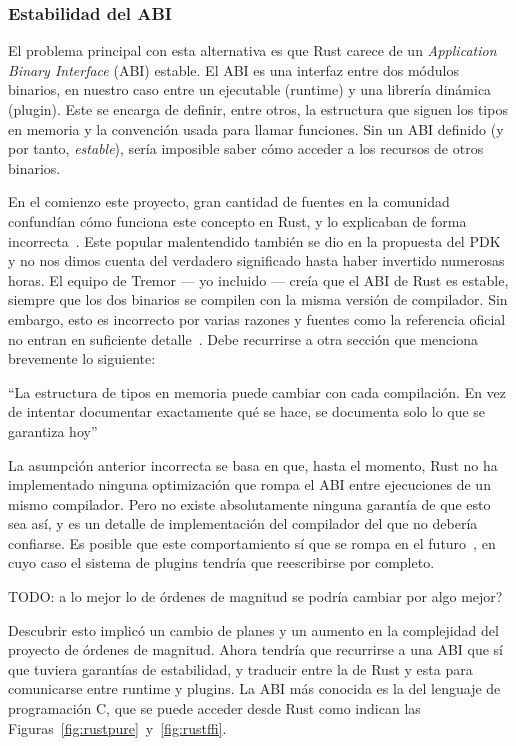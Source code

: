 \subsubsection{Estabilidad del ABI}\label{sec:abi}

El problema principal con esta alternativa es que Rust carece de un
\emph{Application Binary Interface} (ABI) estable. El ABI es una interfaz entre
dos módulos binarios, en nuestro caso entre un ejecutable (runtime) y una
librería dinámica (plugin). Este se encarga de definir, entre otros, la
estructura que siguen los tipos en memoria y la convención usada para llamar
funciones. Sin un ABI definido (y por tanto, \emph{estable}), sería imposible
saber cómo acceder a los recursos de otros binarios.

En el comienzo este proyecto, gran cantidad de fuentes en la comunidad
confundían cómo funciona este concepto en Rust, y lo explicaban de forma
incorrecta~\cite{wrongabi1}\cite{wrongabi2}\cite{wrongabi3}\cite{wrongabi4}.
Este popular malentendido también se dio en la propuesta del PDK y no nos dimos
cuenta del verdadero significado hasta haber invertido numerosas horas. El
equipo de Tremor --- yo incluido --- creía que el ABI de Rust es estable,
siempre que los dos binarios se compilen con la misma versión de compilador. Sin
embargo, esto es incorrecto por varias razones y fuentes como la referencia
oficial no entran en suficiente detalle~\cite[Application Binary Interface
(ABI)]{rustref}. Debe recurrirse a otra sección que menciona brevemente lo
siguiente:

``La estructura de tipos en memoria puede cambiar con cada compilación. En vez
de intentar documentar exactamente qué se hace, se documenta solo lo que se
garantiza hoy''~\cite[Type Layout]{rustref}

La asumpción anterior incorrecta se basa en que, hasta el momento, Rust no ha
implementado ninguna optimización que rompa el ABI entre ejecuciones de un mismo
compilador. Pero no existe absolutamente ninguna garantía de que esto sea así, y
es un detalle de implementación del compilador del que no debería confiarse. Es
posible que este comportamiento sí que se rompa en el
futuro~\cite{randomizelayout}, en cuyo caso el sistema de plugins tendría que
reescribirse por completo.

TODO: a lo mejor lo de órdenes de magnitud se podría cambiar por algo mejor?

Descubrir esto implicó un cambio de planes y un aumento en la complejidad del
proyecto de órdenes de magnitud. Ahora tendría que recurrirse a una ABI que sí
que tuviera garantías de estabilidad, y traducir entre la de Rust y esta para
comunicarse entre runtime y plugins. La ABI más conocida es la del lenguaje de
programación C, que se puede acceder desde Rust como indican las
Figuras~\ref{fig:rustpure}~y~\ref{fig:rustffi}.

